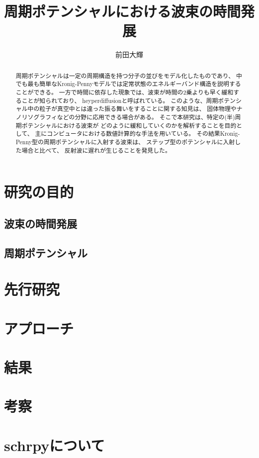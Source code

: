 \documentclass[autodetect-engine,dvipdfmx-if-dvi,ja=standard,a4paper,layout=v2]{bxjsreport}
\author{前田大輝}
\title{周期ポテンシャルにおける波束の時間発展}
\begin{document}
    \maketitle
    \begin{abstract}
      周期ポテンシャルは一定の周期構造を持つ分子の並びをモデル化したものであり、
      中でも最も簡単なKronig-Pennyモデルでは定常状態のエネルギーバンド構造を説明することができる。
      一方で時間に依存した現象では、波束が時間の2乗よりも早く緩和することが知られており、
      heyperdiffusionと呼ばれている。
      このような、周期ポテンシャル中の粒子が真空中とは違った振る舞いをすることに関する知見は、
      固体物理やナノリソグラフィなどの分野に応用できる場合がある。
      そこで本研究は、特定の(半)周期ポテンシャルにおける波束が
      どのように緩和していくのかを解析することを目的として、
      主にコンピュータにおける数値計算的な手法を用いている。
      その結果Kronig-Penny型の周期ポテンシャルに入射する波束は、
      ステップ型のポテンシャルに入射した場合と比べて、
      反射波に遅れが生じることを発見した。
    \end{abstract}
    \tableofcontents
    \chapter{研究の目的}
    \section{波束の時間発展}
    \section{周期ポテンシャル}
    \chapter{先行研究}
    \chapter{アプローチ}
    \chapter{結果}
    \chapter{考察}
    \chapter{schrpyについて}
\end{document}
